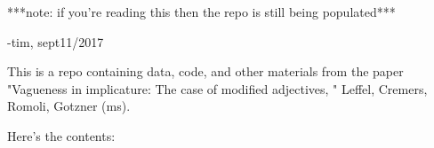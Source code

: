 
	***note: if you're reading this then the repo is still being populated***
		
		-tim, sept11/2017


This is a repo containing data, code, and other materials from the paper "Vagueness in implicature: The case of modified adjectives, " Leffel, Cremers, Romoli, Gotzner (ms). 


Here's the contents: 


